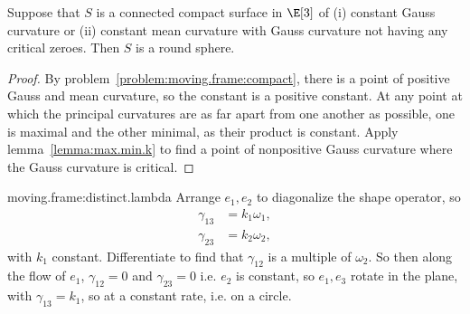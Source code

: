 \begin{theorem}[Liebmann]
Suppose that \(S\) is a connected compact surface in \(\E[3]\) of (i) constant Gauss curvature or (ii) constant mean curvature with Gauss curvature not having any critical zeroes.
Then \(S\) is a round sphere.
\end{theorem}
\begin{proof}
By problem~\vref{problem:moving.frame:compact}, there is a point of positive Gauss and mean curvature, so the constant is a positive constant.
At any point at which the principal curvatures are as far apart from one another as possible, one is maximal and the other minimal, as their product is constant.
Apply lemma~\vref{lemma:max.min.k} to find a point of nonpositive Gauss curvature where the Gauss curvature is critical.
\end{proof}
\begin{answer}{moving.frame:distinct.lambda}
Arrange \(e_1,e_2\) to diagonalize the shape operator, so 
\begin{align*}
\gamma_{13}&=k_1\omega_1,\\
\gamma_{23}&=k_2\omega_2,
\end{align*}
with \(k_1\) constant.
Differentiate to find that \(\gamma_{12}\) is a multiple of \(\omega_2\).
So then along the flow of \(e_1\), \(\gamma_{12}=0\) and \(\gamma_{23}=0\) i.e. \(e_2\) is constant, so \(e_1,e_3\) rotate in the plane, with \(\gamma_{13}=k_1\), so at a constant rate, i.e. on a circle.
\end{answer}

